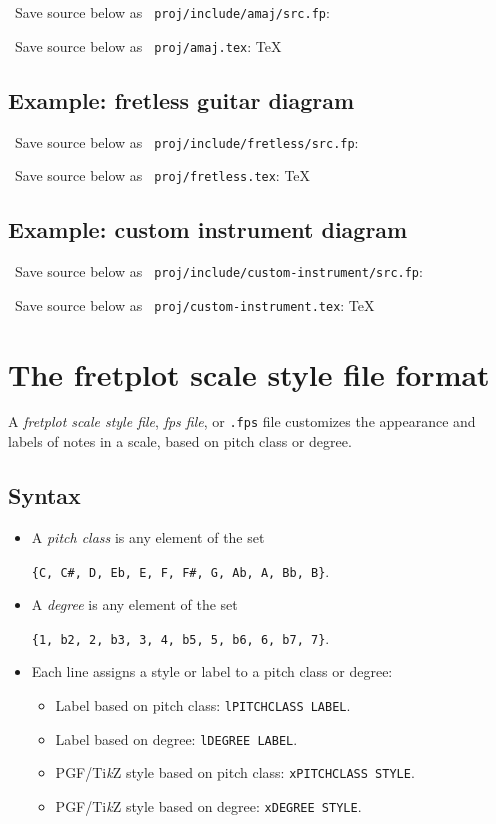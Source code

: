 \documentclass[12pt,letterpaper]{article}
\newcommand{\fpdocexample}[1]{
\captionsetup{font=scriptsize}

{\scriptsize \raisebox{1pt}{\bullet}\ Save source below as \texttt{\color{purple} proj/include/#1/src.fp}:}

{\scriptsize \raisebox{1pt}{\bullet}\ Save source below as \texttt{\color{purple} proj/#1.tex}:}
TeX},emphstyle=]{include/#1/full.tex}
{\scriptsize \raisebox{1pt}{\bullet}\ Run \texttt{\color{purple} lualatex\,\,\,--shell-escape\,\,\,#1.tex} in \texttt{\color{blue} proj/} to get the following output:}


\captionsetup{font=normalsize}
}
\begin{document}
\fpdocexample{amaj}

\subsection{Example: fretless guitar diagram}

\fpdocexample{fretless}

\subsection{Example: custom instrument diagram}

\fpdocexample{custom-instrument}

\newpage

\section{The fretplot scale style file format}

A \textit{fretplot scale style file}, \textit{fps file}, or \texttt{.fps} file customizes the appearance and labels of notes in a scale, based on pitch class or degree.

\subsection{Syntax}

\begin{itemize}
\item A \textit{pitch class} is any element of the set

\begin{center}
\texttt{\{C, C\#, D, Eb, E, F, F\#, G, Ab, A, Bb, B\}}.
\end{center}
\item A \textit{degree} is any element of the set

\begin{center}
\texttt{\{1, b2, 2, b3, 3, 4, b5, 5, b6, 6, b7, 7\}}.
\end{center}

\item Each line assigns a style or label to a pitch class or degree:

\begin{itemize}
  \item Label based on pitch class: \texttt{lPITCHCLASS LABEL}.
  \item Label based on degree: \texttt{lDEGREE LABEL}.
  \item PGF/Ti\textit{k}Z style based on pitch class: \texttt{xPITCHCLASS STYLE}.
  \item PGF/Ti\textit{k}Z style based on degree: \texttt{xDEGREE STYLE}.
\end{itemize}
\end{itemize}
\end{document}
